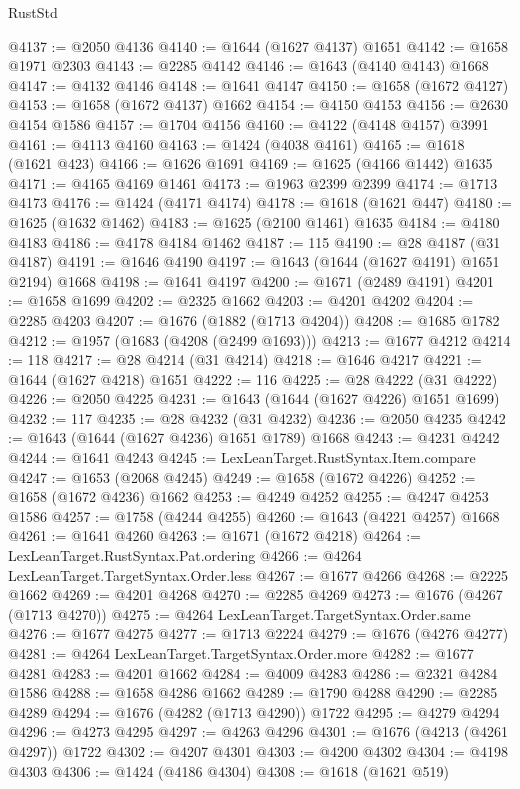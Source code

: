 \begin{lexlean}{RustStd}
\begin{coremodule}
@4137 := @2050 @4136
@4140 := @1644 (@1627 @4137) @1651
@4142 := @1658 @1971 @2303
@4143 := @2285 @4142
@4146 := @1643 (@4140 @4143) @1668
@4147 := @4132 @4146
@4148 := @1641 @4147
@4150 := @1658 (@1672 @4127)
@4153 := @1658 (@1672 @4137) @1662
@4154 := @4150 @4153
@4156 := @2630 @4154 @1586
@4157 := @1704 @4156
@4160 := @4122 (@4148 @4157) @3991
@4161 := @4113 @4160
@4163 := @1424 (@4038 @4161)
@4165 := @1618 (@1621 @423)
@4166 := @1626 @1691
@4169 := @1625 (@4166 @1442) @1635
@4171 := @4165 @4169 @1461
@4173 := @1963 @2399 @2399
@4174 := @1713 @4173
@4176 := @1424 (@4171 @4174)
@4178 := @1618 (@1621 @447)
@4180 := @1625 (@1632 @1462)
@4183 := @1625 (@2100 @1461) @1635
@4184 := @4180 @4183
@4186 := @4178 @4184 @1462
@4187 := 115
@4190 := @28 @4187 (@31 @4187)
@4191 := @1646 @4190
@4197 := @1643 (@1644 (@1627 @4191) @1651 @2194) @1668
@4198 := @1641 @4197
@4200 := @1671 (@2489 @4191)
@4201 := @1658 @1699
@4202 := @2325 @1662
@4203 := @4201 @4202
@4204 := @2285 @4203
@4207 := @1676 (@1882 (@1713 @4204))
@4208 := @1685 @1782
@4212 := @1957 (@1683 (@4208 (@2499 @1693)))
@4213 := @1677 @4212
@4214 := 118
@4217 := @28 @4214 (@31 @4214)
@4218 := @1646 @4217
@4221 := @1644 (@1627 @4218) @1651
@4222 := 116
@4225 := @28 @4222 (@31 @4222)
@4226 := @2050 @4225
@4231 := @1643 (@1644 (@1627 @4226) @1651 @1699)
@4232 := 117
@4235 := @28 @4232 (@31 @4232)
@4236 := @2050 @4235
@4242 := @1643 (@1644 (@1627 @4236) @1651 @1789) @1668
@4243 := @4231 @4242
@4244 := @1641 @4243
@4245 := LexLeanTarget.RustSyntax.Item.compare
@4247 := @1653 (@2068 @4245)
@4249 := @1658 (@1672 @4226)
@4252 := @1658 (@1672 @4236) @1662
@4253 := @4249 @4252
@4255 := @4247 @4253 @1586
@4257 := @1758 (@4244 @4255)
@4260 := @1643 (@4221 @4257) @1668
@4261 := @1641 @4260
@4263 := @1671 (@1672 @4218)
@4264 := LexLeanTarget.RustSyntax.Pat.ordering
@4266 := @4264 LexLeanTarget.TargetSyntax.Order.less
@4267 := @1677 @4266
@4268 := @2225 @1662
@4269 := @4201 @4268
@4270 := @2285 @4269
@4273 := @1676 (@4267 (@1713 @4270))
@4275 := @4264 LexLeanTarget.TargetSyntax.Order.same
@4276 := @1677 @4275
@4277 := @1713 @2224
@4279 := @1676 (@4276 @4277)
@4281 := @4264 LexLeanTarget.TargetSyntax.Order.more
@4282 := @1677 @4281
@4283 := @4201 @1662
@4284 := @4009 @4283
@4286 := @2321 @4284 @1586
@4288 := @1658 @4286 @1662
@4289 := @1790 @4288
@4290 := @2285 @4289
@4294 := @1676 (@4282 (@1713 @4290)) @1722
@4295 := @4279 @4294
@4296 := @4273 @4295
@4297 := @4263 @4296
@4301 := @1676 (@4213 (@4261 @4297)) @1722
@4302 := @4207 @4301
@4303 := @4200 @4302
@4304 := @4198 @4303
@4306 := @1424 (@4186 @4304)
@4308 := @1618 (@1621 @519)

\end{coremodule}
\end{lexlean}
